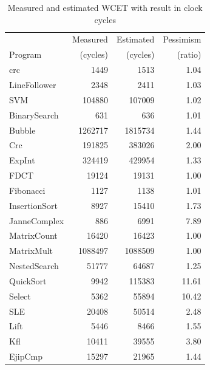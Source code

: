 \begin{table}[t]
\begin{center}
\begin{small}
\begin{tabular}{lrrr}
    \toprule
     & Measured & Estimated & Pessimism \\
    Program             & (cycles) & (cycles) & (ratio) \\
    \midrule
    crc          &     1449 &   1513 & 1.04 \\ %
    LineFollower &     2348&    2411 & 1.03 \\ %
    SVM          &  104880 &  107009 & 1.02 \\
    \midrule
    BinarySearch &     631 &     636 & 1.01  \\
    Bubble       & 1262717 & 1815734 & 1.44 \\
    Crc          &  191825 &  383026 & 2.00 \\
    ExpInt       &  324419 &  429954 & 1.33 \\
    FDCT         &   19124 &   19131 & 1.00 \\
    Fibonacci    &    1127 &    1138 & 1.01 \\
    InsertionSort&    8927 &   15410 & 1.73 \\
    JanneComplex &     886 &    6991 & 7.89 \\
    MatrixCount  &   16420 &   16423 & 1.00 \\
    MatrixMult   & 1088497 &  1088509& 1.00 \\
    NestedSearch &   51777 &   64687 & 1.25 \\
    QuickSort    &    9942 &  115383 & 11.61 \\
    Select       &    5362 &   55894 & 10.42 \\
    SLE          &   20408 &   50514 & 2.48 \\
    \midrule
    Lift         &    5446 &    8466 & 1.55 \\
    Kfl          &   10411 &   39555 & 3.80 \\
    EjipCmp      &   15297 &   21965 & 1.44 \\
    \bottomrule
\end{tabular}
\end{small}
\end{center}
    \caption{Measured and estimated WCET with result in clock
    cycles}
    \label{tab:wcet:compared}
\end{table}

